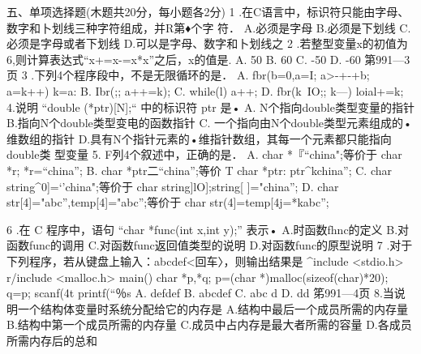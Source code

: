 五、单项选择题(木题共20分，每小题各2分)
1	.在C语言中，标识符只能由字母、数字和卜划线三种字符组成，并R第♦个字
符．
A.必须是字母	B.必须是下划线
C.必须是字母或者下划线	D.可以是字母、数字和卜划线之
2	.若整型变量x的初值为6,则计算表达式“x+=x-=x*x”之后，x的值是.
A. 50	B. 60	C. -50	D. -60
第991—3页
3	.下列4个程序段中，不是无限循环的是．
A. fbr(b=0,a=I; a>-+-+b; a=k++) k=a: B. Ibr(;; a++=k);
C. while(l) { a++; }	D. fbr(k~IO;; k—) loial+=k;
4.说明 “double (*ptr)[N];“ 中的标识符 ptr 是•
A. N个指向double类型变量的指针
B.指向N个double类型变电的函数指针
C. 一个指向由N个double类型元素组成的•维数组的指针
D.具有N个指针元素的•维指针数组，其每一个元素都只能指向double类
型变量
5. F列4个叙述中，正确的是．
A.	char *『“china";等价于 char *r; *r=“china'';
B.	char *ptr二“china”;等价 T char *ptr: ptr^kchina'';
C.	char string^0]={‘'china"};等价于 char string]lO];string[ ]={"china”};
D.	char str[4]="abc”,temp[4]="abc”;等价于 char str(4]=temp[4j=*kabc'';

6	.在 C 程序中，语句 “char *func(int x,int y);” 表示•
A.时函数fhnc的定义	B.对函数func的调用
C.对函数func返回值类型的说明 D.对函数func的原型说明
7	.对于下列程序，若从键盘上输入：abcdef<回车〉，则输出结果是
^include <stdio.h>
r/include <malloc.h>
main()
{ char *p,*q;
p=(char *)malloc(sizeof(char)*20);
q=p;
scanf(4t%
printf(“％s%
}
A. defdef	B. abcdef	C. abc d	D. dd
笫991—4页
8.当说明一个结构体变量时系统分配给它的内存是
A.结构中最后一个成员所需的内存量
B.结构中第一个成员所需的内存量
C.成员中占内存是最大者所需的容量
D.各成员所需内存后的总和